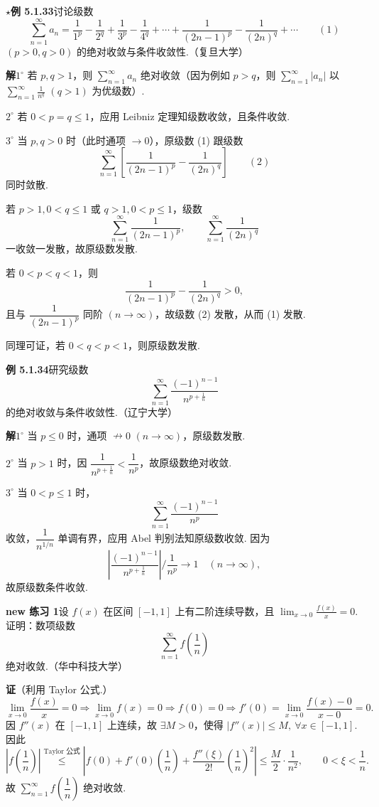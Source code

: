 \documentclass[UTF8,12pt,a4paper,fontset=fandol]{ctexart}
\begin{document}
\noindent\textbf{$\star$例 5.1.33}\quad 讨论级数
\[
  \sum_{n=1}^{\infty}a_n
  =\frac1{1^p}-\frac1{2^q}+\frac1{3^p}-\frac1{4^q}
  +\cdots+\frac1{(2n-1)^p}-\frac1{(2n)^q}+\cdots
\qquad(1)
\]
$(p>0,q>0)$ 的绝对收敛与条件收敛性.（复旦大学）

\noindent\textbf{解}\quad $1^\circ$ 若 $p,q>1$，则 $\displaystyle\sum_{n=1}^{\infty}a_n$ 绝对收敛（因为例如 $p>q$，则 $\displaystyle\sum_{n=1}^{\infty}|a_n|$ 以 $\displaystyle\sum_{n=1}^{\infty}\frac1{n^q}$ $(q>1)$ 为优级数）.

$2^\circ$ 若 $0<p=q\le1$，应用 Leibniz 定理知级数收敛，且条件收敛.

$3^\circ$ 当 $p,q>0$ 时（此时通项 $\to0$），原级数 (1) 跟级数
\[
  \sum_{n=1}^{\infty}\left[\frac1{(2n-1)^p}-\frac1{(2n)^q}\right]
\qquad(2)
\]
同时敛散.

若 $p>1,0<q\le1$ 或 $q>1,0<p\le1$，级数
\[
  \sum_{n=1}^{\infty}\frac1{(2n-1)^p},\qquad
  \sum_{n=1}^{\infty}\frac1{(2n)^q}
\]
一收敛一发散，故原级数发散.

若 $0<p<q<1$，则
\[
  \frac1{(2n-1)^p}-\frac1{(2n)^q}>0,
\]
且与 $\dfrac1{(2n-1)^p}$ 同阶 $(n\to\infty)$，故级数 (2) 发散，从而 (1) 发散.

同理可证，若 $0<q<p<1$，则原级数发散.

\noindent\textbf{例 5.1.34}\quad 研究级数
\[
  \sum_{n=1}^{\infty}\frac{(-1)^{n-1}}{n^{p+\frac1n}}
\]
的绝对收敛与条件收敛性.（辽宁大学）

\noindent\textbf{解}\quad $1^\circ$ 当 $p\le0$ 时，通项 $\nrightarrow0$ $(n\to\infty)$，原级数发散.

$2^\circ$ 当 $p>1$ 时，因 $\dfrac1{n^{p+\frac1n}}<\dfrac1{n^p}$，故原级数绝对收敛.

$3^\circ$ 当 $0<p\le1$ 时，
\[
  \sum_{n=1}^{\infty}\frac{(-1)^{n-1}}{n^p}
\]
收敛，$\dfrac1{n^{1/n}}$ 单调有界，应用 Abel 判别法知原级数收敛. 因为
\[
  \left|\frac{(-1)^{n-1}}{n^{p+\frac1n}}\right|\bigg/\frac1{n^p}\to1\quad(n\to\infty),
\]
故原级数条件收敛.

\noindent\textbf{new 练习 1}\quad 设 $f(x)$ 在区间 $[-1,1]$ 上有二阶连续导数，且 $\displaystyle\lim_{x\to0}\frac{f(x)}x=0$. 证明：数项级数
\[
  \sum_{n=1}^{\infty}f\left(\frac1n\right)
\]
绝对收敛.（华中科技大学）

\noindent\textbf{证}\quad （利用 Taylor 公式.）
\[
  \lim_{x\to0}\frac{f(x)}x=0
  \Rightarrow \lim_{x\to0}f(x)=0\Rightarrow f(0)=0
  \Rightarrow f'(0)=\lim_{x\to0}\frac{f(x)-0}{x-0}=0.
\]
因 $f''(x)$ 在 $[-1,1]$ 上连续，故 $\exists M>0$，使得
$|f''(x)|\le M,\ \forall x\in[-1,1]$. 因此
\[
  \left|f\left(\frac1n\right)\right|
  \stackrel{\text{Taylor 公式}}{\le}
  \left|f(0)+f'(0)\left(\frac1n\right)
  +\frac{f''(\xi)}{2!}\left(\frac1n\right)^2\right|
  \le\frac M2\cdot\frac1{n^2},
  \qquad 0<\xi<\frac1n.
\]
故 $\displaystyle\sum_{n=1}^{\infty}f\left(\dfrac1n\right)$ 绝对收敛.
\end{document}
